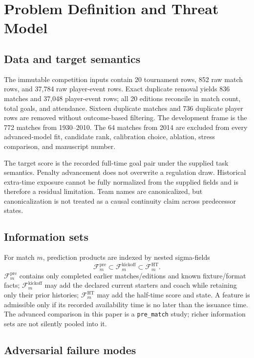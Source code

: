 \documentclass[11pt]{article}
\newcommand{\Fpre}{\mathcal F^{\mathrm{pre}}}
\newcommand{\Fkick}{\mathcal F^{\mathrm{kickoff}}}
\newcommand{\Fht}{\mathcal F^{\mathrm{HT}}}
\begin{document}
\section{Problem Definition and Threat Model}

\subsection{Data and target semantics}

The immutable competition inputs contain 20 tournament rows, 852 raw match rows, and 37,784 raw
player-event rows.  Exact duplicate removal yields 836 matches and 37,048 player-event rows; all 20
editions reconcile in match count, total goals, and attendance.  Sixteen duplicate matches and 736
duplicate player rows are removed without outcome-based filtering.  The development frame is the
772 matches from 1930--2010.  The 64 matches from 2014 are excluded from every advanced-model fit,
candidate rank, calibration choice, ablation, stress comparison, and manuscript number.

The target score is the recorded full-time goal pair under the supplied task semantics.  Penalty
advancement does not overwrite a regulation draw.  Historical extra-time exposure cannot be fully
normalized from the supplied fields and is therefore a residual limitation.  Team names are
canonicalized, but canonicalization is not treated as a causal continuity claim across predecessor
states.

\subsection{Information sets}

For match $m$, prediction products are indexed by nested sigma-fields
\begin{equation}
  \Fpre_m \subset \Fkick_m \subset \Fht_m.
\end{equation}
$\Fpre_m$ contains only completed earlier matches/editions and known fixture/format facts;
$\Fkick_m$ may add the declared current starters and coach while retaining only their prior
histories; $\Fht_m$ may add the half-time score and state.  A feature is admissible only if its
recorded availability time is no later than the issuance time.  The advanced comparison in this
paper is a \texttt{pre\_match} study; richer information sets are not silently pooled into it.

\subsection{Adversarial failure modes}
\end{document}
